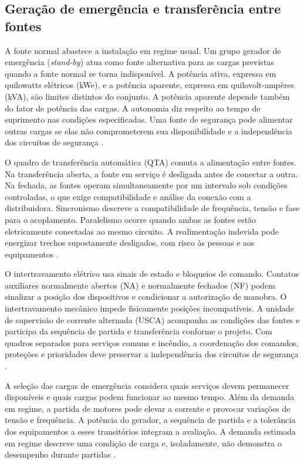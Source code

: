 \subsection{Geração de emergência e transferência entre fontes}
\label{subsec:fund-gerador-qta}

A fonte normal abastece a instalação em regime usual. Um grupo gerador de emergência (\emph{stand-by}) atua como fonte alternativa para as cargas previstas quando a fonte normal se torna indisponível. A potência ativa, expressa em quilowatts elétricos (kWe), e a potência aparente, expressa em quilovolt-ampères (kVA), são limites distintos do conjunto. A potência aparente depende também do fator de potência das cargas. A autonomia diz respeito ao tempo de suprimento nas condições especificadas. Uma fonte de segurança pode alimentar outras cargas se elas não comprometerem sua disponibilidade e a independência dos circuitos de segurança \cite[seção~6.6]{abnt5410}.

O quadro de transferência automática (QTA) comuta a alimentação entre fontes. Na transferência aberta, a fonte em serviço é desligada antes de conectar a outra. Na fechada, as fontes operam simultaneamente por um intervalo sob condições controladas, o que exige compatibilidade e análise da conexão com a distribuidora. Sincronismo descreve a compatibilidade de frequência, tensão e fase para o acoplamento. Paralelismo ocorre quando ambas as fontes estão eletricamente conectadas ao mesmo circuito. A realimentação indevida pode energizar trechos supostamente desligados, com risco às pessoas e aos equipamentos \cite[utilização de fontes de segurança]{abnt5410}\cite{schneiderats}\cite[item~7.11.13]{enel1580}.

O intertravamento elétrico usa sinais de estado e bloqueios de comando. Contatos auxiliares normalmente abertos (NA) e normalmente fechados (NF) podem sinalizar a posição dos dispositivos e condicionar a autorização de manobra. O intertravamento mecânico impede fisicamente posições incompatíveis. A unidade de supervisão de corrente alternada (USCA) acompanha as condições das fontes e participa da sequência de partida e transferência conforme o projeto. Com quadros separados para serviços comuns e incêndio, a coordenação dos comandos, proteções e prioridades deve preservar a independência dos circuitos de segurança \cite[itens~6.6.6.5--6.6.6.7 e~6.6.7]{abnt5410}\cite[tabela~5]{enel1580}\cite{schneiderats}.

A seleção das cargas de emergência considera quais serviços devem permanecer disponíveis e quais cargas podem funcionar ao mesmo tempo. Além da demanda em regime, a partida de motores pode elevar a corrente e provocar variações de tensão e frequência. A potência do gerador, a sequência de partida e a tolerância dos equipamentos a esses transitórios integram a avaliação. A demanda estimada em regime descreve uma condição de carga e, isoladamente, não demonstra o desempenho durante partidas \cite[seção~6.6]{abnt5410}\cite{schneiderats}.

